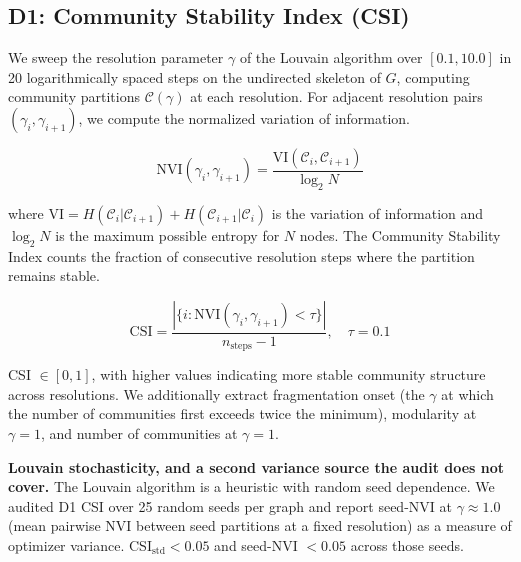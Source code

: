 \documentclass[11pt,a4paper]{article}
\begin{document}
\subsection{D1: Community Stability Index (CSI)}

We sweep the resolution parameter $\gamma$ of the Louvain algorithm
over $[0.1, 10.0]$ in 20 logarithmically spaced steps on the
undirected skeleton of $G$, computing community partitions
$\mathcal{C}(\gamma)$ at each resolution. For adjacent resolution
pairs $(\gamma_i, \gamma_{i+1})$, we compute the normalized variation
of information.

\begin{equation}
  \text{NVI}(\gamma_i, \gamma_{i+1})
  = \frac{\text{VI}(\mathcal{C}_i, \mathcal{C}_{i+1})}
         {\log_2 N}
\end{equation}

\noindent where $\text{VI} = H(\mathcal{C}_i | \mathcal{C}_{i+1})
+ H(\mathcal{C}_{i+1} | \mathcal{C}_i)$ is the variation of
information and $\log_2 N$ is the maximum possible entropy for $N$
nodes. The Community Stability Index counts the fraction of
consecutive resolution steps where the partition remains stable.

\begin{equation}
  \text{CSI} = \frac{|\{i : \text{NVI}(\gamma_i, \gamma_{i+1}) < \tau\}|}
                    {n_{\text{steps}} - 1}, \quad \tau = 0.1
\end{equation}

CSI $\in [0, 1]$, with higher values indicating more stable community
structure across resolutions. We additionally extract fragmentation
onset (the $\gamma$ at which the number of communities first exceeds
twice the minimum), modularity at $\gamma = 1$, and number of
communities at $\gamma = 1$.

\textbf{Louvain stochasticity, and a second variance source the audit
does not cover.} The Louvain algorithm is a heuristic with random seed
dependence. We audited D1 CSI over 25 random seeds per graph and report
seed-NVI at $\gamma \approx 1.0$ (mean pairwise NVI between seed
partitions at a fixed resolution) as a measure of optimizer variance.
CSI$_{\text{std}} < 0.05$ and seed-NVI $< 0.05$ across those seeds.
\end{document}
